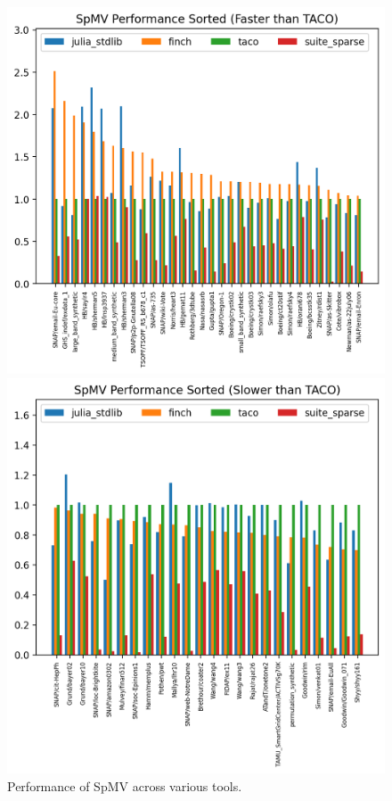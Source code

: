 \documentclass{article}
\begin{document}
\begin{figure}
    \begin{minipage}[t]{0.5\textwidth}
        \vspace{0pt} %
        \includegraphics[width=\linewidth]{spmv_performance_sorted_(faster_than_taco).png}
    \end{minipage}%
    \begin{minipage}[t]{0.5\textwidth}
        \vspace{0pt} %
        \includegraphics[width=\linewidth]{spmv_performance_sorted_(slower_than_taco).png}
    \end{minipage}
    \caption{Performance of SpMV across various tools.}
\end{figure}
\end{document}
